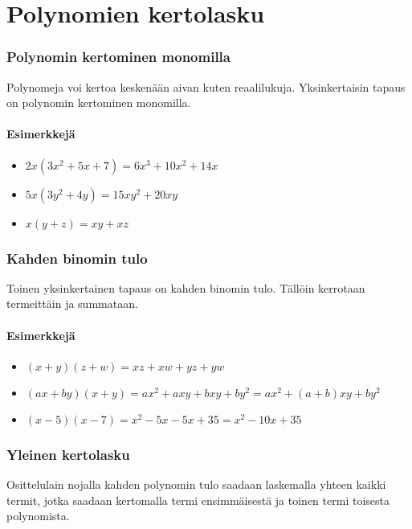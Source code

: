 \chapter{Polynomien kertolasku}

\subsection*{Polynomin kertominen monomilla}

Polynomeja voi kertoa keskenään aivan kuten reaalilukuja. Yksinkertaisin tapaus on polynomin kertominen monomilla.

\subsubsection*{Esimerkkejä}
\begin{itemize}
    \item $2x(3x^2+5x+7) = 6x^3+10x^2+14x$
    \item $5x(3y^2+4y) = 15xy^2+20xy$
    \item $x(y+z) = xy+xz$
\end{itemize}

\subsection*{Kahden binomin tulo}

Toinen yksinkertainen tapaus on kahden binomin tulo. Tällöin kerrotaan termeittäin ja summataan.

\subsubsection*{Esimerkkejä}
\begin{itemize}
    \item $(x+y)(z+w) = xz+xw+yz+yw$
    \item $(ax+by)(x+y) = ax^2+axy+bxy+by^2 = ax^2+(a+b)xy+by^2$
    \item $(x-5)(x-7) = x^2-5x-5x+35 = x^2-10x+35$
\end{itemize}

\subsection*{Yleinen kertolasku}

Osittelulain nojalla kahden polynomin tulo saadaan laskemalla yhteen kaikki
termit, jotka saadaan kertomalla termi ensimmäisestä ja toinen termi toisesta
polynomista.

